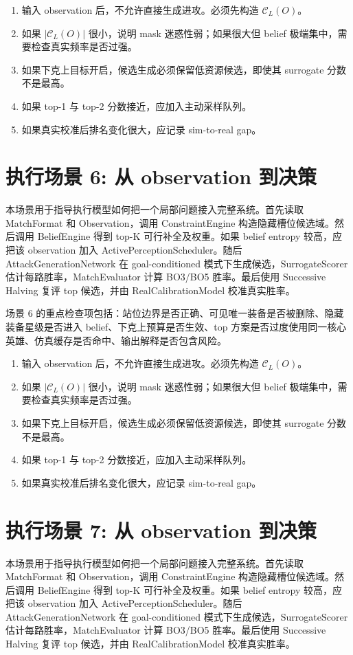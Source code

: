 \documentclass[UTF8,12pt,openany]{ctexbook}
\newcommand{\Ccal}{\mathcal{C}}
\begin{document}
\begin{enumerate}[leftmargin=2em]
\item 输入 observation 后，不允许直接生成进攻。必须先构造 $\Ccal_L(O)$。
\item 如果 $|\Ccal_L(O)|$ 很小，说明 mask 迷惑性弱；如果很大但 belief 极端集中，需要检查真实频率是否过强。
\item 如果下克上目标开启，候选生成必须保留低资源候选，即使其 surrogate 分数不是最高。
\item 如果 top-1 与 top-2 分数接近，应加入主动采样队列。
\item 如果真实校准后排名变化很大，应记录 sim-to-real gap。
\end{enumerate}


\section{执行场景 6: 从 observation 到决策}
本场景用于指导执行模型如何把一个局部问题接入完整系统。首先读取 MatchFormat 和 Observation，调用 ConstraintEngine 构造隐藏槽位候选域。然后调用 BeliefEngine 得到 top-K 可行补全及权重。如果 belief entropy 较高，应把该 observation 加入 ActivePerceptionScheduler。随后 AttackGenerationNetwork 在 goal-conditioned 模式下生成候选，SurrogateScorer 估计每路胜率，MatchEvaluator 计算 BO3/BO5 胜率。最后使用 Successive Halving 复评 top 候选，并由 RealCalibrationModel 校准真实胜率。

场景 6 的重点检查项包括：站位边界是否正确、可见唯一装备是否被删除、隐藏装备星级是否进入 belief、下克上预算是否生效、top 方案是否过度使用同一核心英雄、仿真缓存是否命中、输出解释是否包含风险。

\begin{enumerate}[leftmargin=2em]
\item 输入 observation 后，不允许直接生成进攻。必须先构造 $\Ccal_L(O)$。
\item 如果 $|\Ccal_L(O)|$ 很小，说明 mask 迷惑性弱；如果很大但 belief 极端集中，需要检查真实频率是否过强。
\item 如果下克上目标开启，候选生成必须保留低资源候选，即使其 surrogate 分数不是最高。
\item 如果 top-1 与 top-2 分数接近，应加入主动采样队列。
\item 如果真实校准后排名变化很大，应记录 sim-to-real gap。
\end{enumerate}


\section{执行场景 7: 从 observation 到决策}
本场景用于指导执行模型如何把一个局部问题接入完整系统。首先读取 MatchFormat 和 Observation，调用 ConstraintEngine 构造隐藏槽位候选域。然后调用 BeliefEngine 得到 top-K 可行补全及权重。如果 belief entropy 较高，应把该 observation 加入 ActivePerceptionScheduler。随后 AttackGenerationNetwork 在 goal-conditioned 模式下生成候选，SurrogateScorer 估计每路胜率，MatchEvaluator 计算 BO3/BO5 胜率。最后使用 Successive Halving 复评 top 候选，并由 RealCalibrationModel 校准真实胜率。
\end{document}
